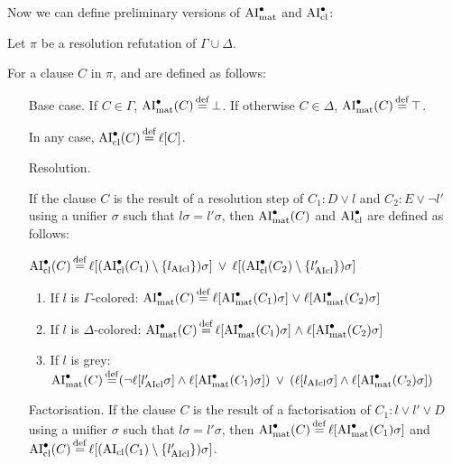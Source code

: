 \documentclass[,%
	draft=false,%
	numbers=noendperiod
	oneside,openany
	a4paper,
	11pt,
]{memoir}
\begin{document}
Now we can define preliminary versions of $\operatorname{AI}_\mathrm{mat}^\bullet$ and $\operatorname{AI}_\mathrm{cl}^\bullet$:

\begin{defi}
	Let $\pi$ be a resolution refutation of $\Gamma \cup \Delta$.

	For a clause $C$ in $\pi$,  and  are defined as follows:
	\begin{itemize}
		\item[Base case.]
			If $C \in \Gamma$, $\operatorname{AI}_\mathrm{mat}^\bullet(C) \operatorname{\stackrel{\mathrm{def}}{=}} \bot$.
			If otherwise $C \in \Delta$, $\operatorname{AI}_\mathrm{mat}^\bullet(C) \operatorname{\stackrel{\mathrm{def}}{=}} \top$.

			In any case, $\operatorname{AI}_\mathrm{cl}^\bullet(C) \operatorname{\stackrel{\mathrm{def}}{=}} \ell[C]$.
		\item[Resolution.]

			If the clause $C$ is the result of a resolution step of $C_1: D \lor l$ and $C_2: E \lor \lnot l'$ using a unifier $\sigma$ such that $l\sigma =  l'\sigma$, then $\operatorname{AI}_\mathrm{mat}^\bullet(C)$ and $\operatorname{AI}_\mathrm{cl}^\bullet$ are defined as follows:

			$\operatorname{AI}_\mathrm{cl}^\bullet(C) \operatorname{\stackrel{\mathrm{def}}{=}} \ell[(\operatorname{AI}_\mathrm{cl}^\bullet(C_1) \setminus \{l_{\operatorname{AIcl}}\})\sigma] \;\,{\lor}\;\, \ell[(\operatorname{AI}_\mathrm{cl}^\bullet(C_2)\setminus \{l_{\operatorname{AIcl}}'\})\sigma] $

			\begin{enumerate}

				\item If $l$ is $\Gamma$-colored:
					$\operatorname{AI}_\mathrm{mat}^\bullet(C) \operatorname{\stackrel{\mathrm{def}}{=}} \ell[\operatorname{AI}_\mathrm{mat}^\bullet(C_1)\sigma]\;{\lor}\; \ell[\operatorname{AI}_\mathrm{mat}^\bullet(C_2)\sigma] $

				\item If $l$ is $\Delta$-colored:
					$\operatorname{AI}_\mathrm{mat}^\bullet(C) \operatorname{\stackrel{\mathrm{def}}{=}} \ell[\operatorname{AI}_\mathrm{mat}^\bullet(C_1)\sigma]\;{\land}\; \ell[\operatorname{AI}_\mathrm{mat}^\bullet(C_2)\sigma] $

				\item If $l$ is grey:
					$\operatorname{AI}_\mathrm{mat}^\bullet(C) \operatorname{\stackrel{\mathrm{def}}{=}}
					(\lnot {\ell[l'\ensuremath{_{\operatorname{AIcl}}}\sigma]} \land \ell[\operatorname{AI}_\mathrm{mat}^\bullet(C_1)\sigma]) \;\,{\lor}\;\,
					(\ell[l_{\operatorname{AIcl}}\sigma]\land \ell[\operatorname{AI}_\mathrm{mat}^\bullet(C_2)\sigma ])
					$

			\end{enumerate}

		\item[Factorisation.]
			If the clause $C$ is the result of a factorisation of $C_1: l \lor l' \lor D$ using a unifier $\sigma$ such that $l\sigma = l'\sigma$, then $\operatorname{AI}_\mathrm{mat}^\bullet(C) \operatorname{\stackrel{\mathrm{def}}{=}} \ell[\operatorname{AI}_\mathrm{mat}^\bullet(C_1)\sigma]$ and $\AIclpre(C) \defeq \lifboth{ (\AIclause(C_1) \setminus\nolinebreak \{l'\cl\})\sigma}$.
			\qedhere

	\end{itemize}
\end{defi}
\end{document}
